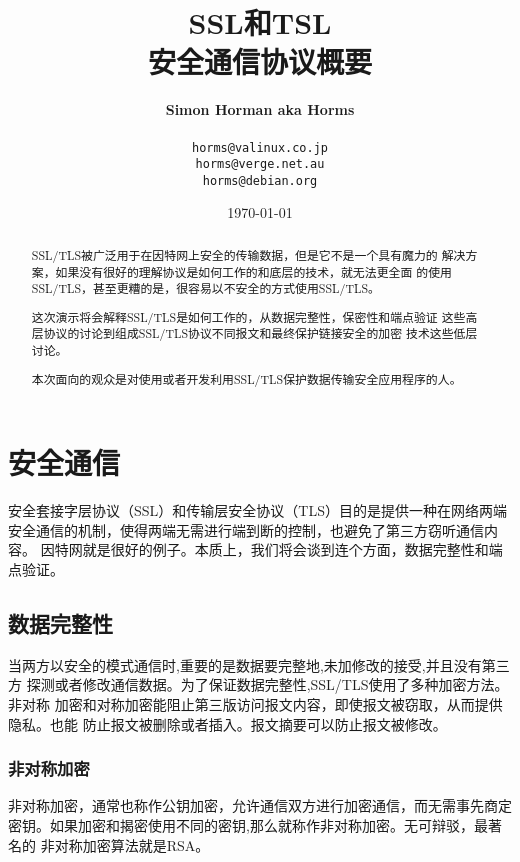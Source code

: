 \documentclass[11pt]{article}
\title{SSL和TSL\\
安全通信协议概要}
\author{\textbf{Simon Horman aka Horms} \\
        \\
\texttt{horms@valinux.co.jp}\\
\texttt{horms@verge.net.au}\\
\texttt{horms@debian.org}}
\date{\today}
\begin{document}
\maketitle
\pagebreak

\begin{abstract}

          SSL/TLS被广泛用于在因特网上安全的传输数据，但是它不是一个具有魔力的
        解决方案，如果没有很好的理解协议是如何工作的和底层的技术，就无法更全面
        的使用SSL/TLS，甚至更糟的是，很容易以不安全的方式使用SSL/TLS。

        这次演示将会解释SSL/TLS是如何工作的，从数据完整性，保密性和端点验证
        这些高层协议的讨论到组成SSL/TLS协议不同报文和最终保护链接安全的加密
        技术这些低层讨论。

        本次面向的观众是对使用或者开发利用SSL/TLS保护数据传输安全应用程序的人。


\end{abstract}

\tableofcontents

\section{安全通信}

安全套接字层协议（SSL）和传输层安全协议（TLS）目的是提供一种在网络两端
安全通信的机制，使得两端无需进行端到断的控制，也避免了第三方窃听通信内容。
因特网就是很好的例子。本质上，我们将会谈到连个方面，数据完整性和端点验证。
\\

\subsection{数据完整性}
当两方以安全的模式通信时,重要的是数据要完整地,未加修改的接受,并且没有第三方
探测或者修改通信数据。为了保证数据完整性,SSL/TLS使用了多种加密方法。非对称
加密和对称加密能阻止第三版访问报文内容，即使报文被窃取，从而提供隐私。也能
防止报文被删除或者插入。报文摘要可以防止报文被修改。\\

\subsubsection{非对称加密}
非对称加密，通常也称作公钥加密，允许通信双方进行加密通信，而无需事先商定
密钥。如果加密和揭密使用不同的密钥,那么就称作非对称加密。无可辩驳，最著名的
非对称加密算法就是RSA。\\
\end{document}
